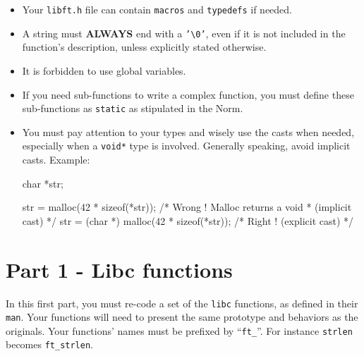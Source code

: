 \documentclass{42-en}
\begin{document}
        \begin{itemize}

            \item Your \texttt{libft.h} file can contain
              \texttt{macros} and \texttt{typedefs} if needed.

            \item A string must \textbf{ALWAYS} end with a
              \texttt{'\textbackslash{}0'}, even if it is not included
              in the function’s description, unless explicitly stated
              otherwise.

            \item It is forbidden to use global variables.

            \item If you need sub-functions to write a complex
              function, you must define these sub-functions as
              \texttt{static} as stipulated in the Norm.

        \end{itemize}


        \begin{itemize}

            \item You must pay attention to your types and wisely use
              the casts when needed, especially when a \texttt{void*}
              type is involved. Generally speaking, avoid implicit
              casts. Example:

            \begin{42ccode}
char    *str;

str = malloc(42 * sizeof(*str));            /* Wrong ! Malloc returns a void * (implicit cast) */
str = (char *) malloc(42 * sizeof(*str));   /* Right ! (explicit cast) */
            \end{42ccode}

        \end{itemize}

    \newpage
    \section{Part 1 - Libc functions}

        In this first part, you must re-code a set of the
        \texttt{libc} functions, as defined in their
        \texttt{man}. Your functions will need to present the same
        prototype and behaviors as the originals. Your functions’
        names must be prefixed by ``\texttt{ft\_}''. For instance
        \texttt{strlen} becomes \texttt{ft\_strlen}.
\end{document}
